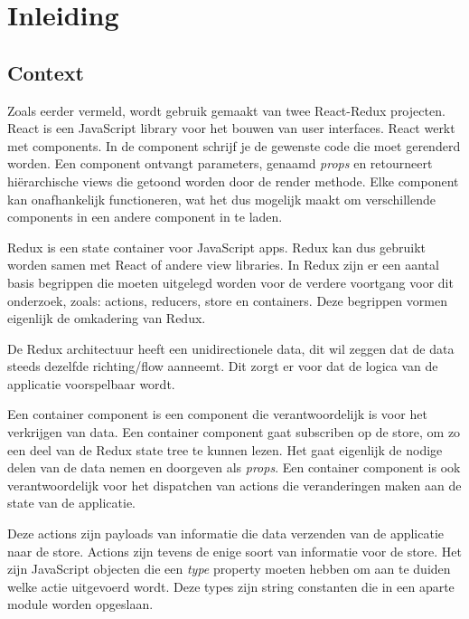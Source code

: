 
\chapter*{Inleiding}
\label{ch:inleiding}

\section{Context}
\label{sec:context}

Zoals eerder vermeld, wordt gebruik gemaakt van twee React-Redux projecten. React is een JavaScript library voor het bouwen van user interfaces. React werkt met components. In de component schrijf je de gewenste code die moet gerenderd worden. Een component ontvangt parameters, genaamd \textit{props} en retourneert hiërarchische views die getoond worden door de render methode. Elke component kan onafhankelijk functioneren, wat het dus mogelijk maakt om verschillende components in een andere component in te laden. \autocite{React01} 

Redux is een state container voor JavaScript apps. Redux kan dus gebruikt worden samen met React of andere view libraries. 
In Redux zijn er een aantal basis begrippen die moeten uitgelegd worden voor de verdere voortgang voor dit onderzoek, zoals: actions, reducers, store en containers. Deze begrippen vormen eigenlijk de omkadering van Redux. \autocite{Redux02}

De Redux architectuur heeft een unidirectionele data, dit wil zeggen dat de data steeds dezelfde richting/flow aanneemt. Dit zorgt er voor dat de logica van de applicatie voorspelbaar wordt.  

Een container component is een component die verantwoordelijk is voor het verkrijgen van data. Een container component gaat subscriben op de store, om zo een deel van de Redux state tree te kunnen lezen. Het gaat eigenlijk de nodige delen van de data nemen en doorgeven als \textit{props}. Een container component is ook verantwoordelijk voor het dispatchen van actions die veranderingen maken aan de state van de applicatie. 

Deze actions zijn payloads van informatie die data verzenden van de applicatie naar de store. Actions zijn tevens de enige soort van informatie voor de store. Het zijn JavaScript objecten die een \textit{type} property moeten hebben om aan te duiden welke actie uitgevoerd wordt. Deze types zijn string constanten die in een aparte module worden opgeslaan. 

